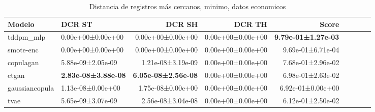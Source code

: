 \begin{table}[H]
\centering
\fontsize{10}{14}\selectfont
\caption{Distancia de registros más cercanos, minimo, datos economicos}
\label{table-dcr-economicos-a-min}
\begin{tabular}{|l|l|r|r|r|r|r|r|r|}
\hline
\rowcolor[gray]{0.8}
Modelo & DCR ST & DCR SH & DCR TH & \textbf{Score} \\
\hline tddpm\_mlp & \cellcolor[rgb]{0.9, 0.54, 0.52} 0.00e+00±0.00e+00 & \cellcolor[rgb]{0.9, 0.54, 0.52} 0.00e+00±0.00e+00 & 0.00e+00±0.00e+00 & \bfseries 9.79e-01±1.27e-03 \\
\hline smote-enc & \cellcolor[rgb]{0.9, 0.54, 0.52} 0.00e+00±0.00e+00 & \cellcolor[rgb]{0.9, 0.54, 0.52} 0.00e+00±0.00e+00 & 0.00e+00±0.00e+00 & 9.69e-01±6.71e-04 \\
\hline copulagan & 5.88e-09±2.05e-09 & 1.21e-08±3.19e-09 & 0.00e+00±0.00e+00 & 7.68e-01±2.96e-02 \\
\hline ctgan & \bfseries 2.83e-08±3.88e-08 & \bfseries 6.05e-08±2.56e-08 & 0.00e+00±0.00e+00 & 6.98e-01±2.63e-02 \\
\hline gaussiancopula & 1.13e-08±0.00e+00 & 1.75e-08±0.00e+00 & 0.00e+00±0.00e+00 & 6.92e-01±0.00e+00 \\
\hline tvae & 5.65e-09±3.07e-09 & 2.56e-08±3.04e-08 & 0.00e+00±0.00e+00 & \cellcolor[rgb]{0.9, 0.54, 0.52} 6.12e-01±2.50e-02 \\
\hline
\end{tabular}
\end{table}

